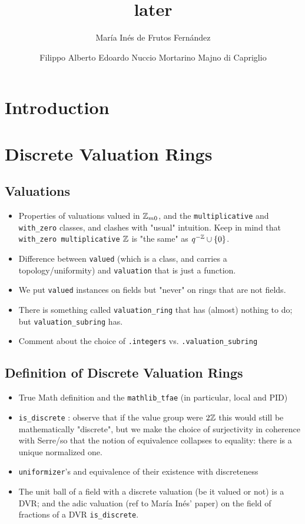 \documentclass[sigplan,10pt,anonymous,review]{acmart}\settopmatter{printfolios=true,printccs=false,printacmref=false}
\author[M.~I.~de Frutos Fernández]{María Inés de Frutos Fernández}
\author[F.~A.~E.~Nuccio]{Filippo Alberto Edoardo Nuccio Mortarino Majno di Capriglio}
\title{later}
\begin{document}
\maketitle
\section{Introduction}
\section {Discrete Valuation Rings}
\subsection{Valuations}
\begin{itemize}
\item Properties of valuations valued in $\mathbb{Z}_{m0}$, and the \texttt{multiplicative} and \texttt{with\_zero} classes, and clashes with "usual" intuition. Keep in mind that \texttt{with\_zero multiplicative} $\mathbb{Z}$ is "the same" as $q^{-\mathbb{Z}}\cup \{0\}$.
\item Difference between \texttt{valued} (which is a class, and carries a topology/uniformity) and \texttt{valuation} that is just a function.
\item We put \texttt{valued} instances on fields but "never" on rings that are not fields.
\item There is something called \texttt{valuation\_ring} that has (almost) nothing to do; but \texttt{valuation\_subring} has.
\item Comment about the choice of \texttt{.integers} vs. \texttt{.valuation\_subring}
\end{itemize}
\subsection{Definition of Discrete Valuation Rings}
\begin{itemize}
\item True Math definition and the \texttt{mathlib\_tfae} (in particular, local and PID)
\item \texttt{is\_discrete} : observe that if the value group were $2\mathbb{Z}$ this would still be mathematically "discrete", but we make the choice of surjectivity in coherence with Serre/so that the notion of equivalence collapses to equality: there is a unique normalized one.
\item \texttt{uniformizer}'s and equivalence of their existence with discreteness
\item The unit ball of a field with a discrete valuation (be it valued or not) is a DVR; and the adic valuation (ref to María Inés' paper) on the field of fractions of a DVR \texttt{is\_discrete}.
\end{itemize}
\end{document}
